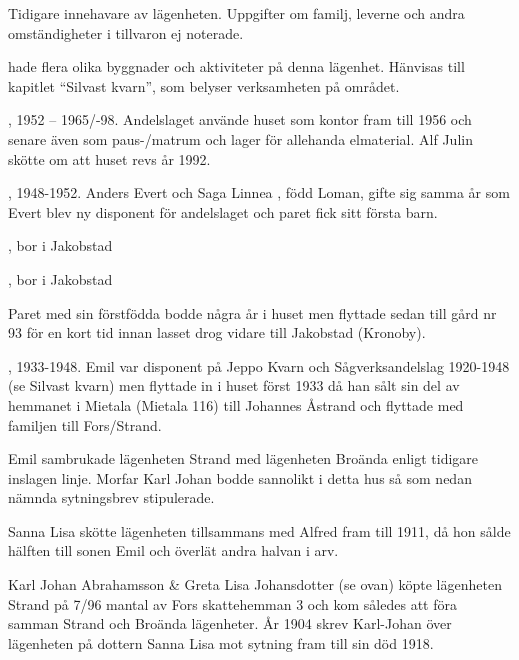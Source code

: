 
Tidigare innehavare av lägenheten. Uppgifter om familj, leverne och andra omständigheter i tillvaron ej noterade.





 hade flera olika byggnader och aktiviteter på denna lägenhet. Hänvisas till kapitlet ``Silvast kvarn'', som belyser verksamheten på området.

,
1952 – 1965/-98.
Andelslaget använde huset som kontor fram till 1956 och senare även som paus-/matrum och lager för allehanda elmaterial. Alf Julin skötte om att huset revs år 1992.

,
1948-1952.
Anders Evert  och Saga Linnea , född Loman, gifte sig samma år som Evert blev ny disponent för andelslaget och paret fick sitt första barn.
\begin{jhchildren}
  \item {}, bor i Jakobstad
  \item {}, bor i Jakobstad
\end{jhchildren}
Paret med sin förstfödda bodde några år i huset men flyttade sedan till gård nr 93 för en kort tid innan lasset drog vidare till Jakobstad (Kronoby).

,
1933-1948.
Emil var disponent på Jeppo Kvarn och Sågverksandelslag 1920-1948 (se Silvast kvarn) men flyttade in i huset först 1933 då han sålt sin del av hemmanet i Mietala (Mietala 116) till Johannes Åstrand och flyttade med familjen till Fors/Strand.



Emil sambrukade lägenheten Strand med lägenheten Broända enligt tidigare inslagen linje. Morfar Karl Johan bodde sannolikt i detta hus så som nedan nämnda sytningsbrev stipulerade.



Sanna Lisa skötte lägenheten tillsammans med Alfred fram till 1911,	då hon sålde hälften till sonen Emil och överlät andra halvan i arv.



Karl Johan Abrahamsson \& Greta Lisa Johansdotter (se ovan) köpte lägenheten Strand på 7/96 mantal av Fors skattehemman 3 och kom således att föra samman Strand och Broända lägenheter. År 1904 skrev Karl-Johan över lägenheten på dottern Sanna Lisa mot sytning fram till sin död 1918.


